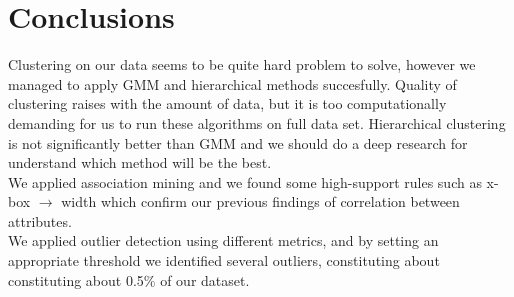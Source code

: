 \chapter*{Conclusions}
Clustering on our data seems to be quite hard problem to solve, however we managed to apply  GMM and hierarchical methods succesfully. Quality of clustering raises with the amount of data, but it is too computationally demanding for us to run these algorithms on full data set. Hierarchical clustering is not significantly better than GMM and we should do a deep research for understand which method will be the best.\\

\noindent We applied association mining and we found some high-support rules such as  x-box $\rightarrow$ width  which confirm our previous findings of correlation between attributes.\\

\noindent We applied outlier detection using different metrics, and by setting an appropriate threshold we identified several outliers, constituting about constituting about 0.5\% of our dataset. 